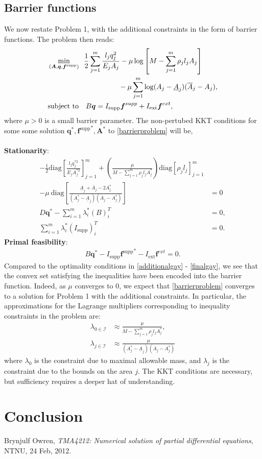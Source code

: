 \documentclass[10pt,a4paper]{article}
\begin{document}
\subsection{Barrier functions}
We now restate Problem 1, with the additional constraints in the form of barrier functions. The problem then reads:
\begin{align}\label{barrierproblem}
&\min_{(\boldsymbol{A},\boldsymbol{q},\boldsymbol{f}^\text{supp})} \enspace \frac{1}{2}\sum_{j=1}^m
\frac{l_j q_j^2}{E_j A_j} - \mu \log \left[ M - \sum_{j=1}^m \rho_j l_j A_j \right] \\
\nonumber & \hspace{35 mm} - \mu \sum_{j=1}^m \log (A_j-\underline{A}_j)(\overline{A}_j-A_j),\\
&\text{subject to} \quad B\boldsymbol{q} = I_\text{supp}\boldsymbol{f}^{supp}+I_\text{ext}\boldsymbol{f}^{ext}\nonumber,
\end{align}
where $\mu > 0 $ is a small barrier parameter.
\newpage
\noindent
The non-pertubed KKT conditions for some some solution $\boldsymbol{q}^*,{\boldsymbol{f}^\text{supp}}^*,\boldsymbol{A}^*$ to \eqref{barrierproblem} will be,
\\\\
\textbf{Stationarity}:
\begin{align}
-\frac{1}{2}\text{diag}\left[ \frac{l_j q_j^{*2}}{E_j A_j^{*2}}\right]_{j=1}^m + \left(\frac{\mu}{M-\sum_{j=1}^m \rho_j l_j A_j^*}\right) \text{diag}\left[ \rho_j l_j \right]_{j=1}^m \\
-\mu \ \text{diag}\left[\frac{\underline{A}_j+\overline{A}_j-2A_j^*}{(A_j^*-\underline{A}_j)(\overline{A}_j-A_j^*)}\right]&=0 \nonumber\\
D\boldsymbol{q}^* - \sum_{i=1}^m \lambda_i^*(B)_i^T &= 0,\\
\sum_{i=1}^m \lambda_i^*(I_\text{supp})_i^T &= 0.
\end{align}
\textbf{Primal feasibility}:
\begin{align}
B\boldsymbol{q}^*-I_\text{supp}{\boldsymbol{f}^\text{supp}}^*-I_\text{ext}\boldsymbol{f}^{ext}=0.
\end{align}
Compared to the optimality conditions in \eqref{additionalgay} - \eqref{finalgay}, we see that the convex set satisfying the inequalities have been encoded into the barrier function. Indeed, as $\mu$ converges to $0$, we expect that \eqref{barrierproblem} converges to a solution for Problem 1 with the additional constraints. In particular, the approximations for the Lagrange multipliers corresponding to inequality constraints in the problem are:
\begin{align}
\lambda_{0\in\mathcal{I}} &\approx \frac{\mu}{M-\sum_{j=1}^m \rho_j l_j A_j^*},\\
\lambda_{j\in\mathcal{I}} &\approx \frac{\mu}{(A_j^*-\underline{A}_j)(\overline{A}_j-A_j^*)}
\end{align}
where $\lambda_0$ is the constraint due to maximal allowable mass, and $\lambda_j$ is the constraint due to the bounds on the area $j$. The KKT conditions are necessary, but sufficiency requires a deeper hat of understanding.
\section{Conclusion}
\begin{thebibliography}{2}
Brynjulf Owren, \emph{TMA4212: Numerical solution of partial differential equations}, NTNU, 24 Feb, 2012.
\end{thebibliography}
\end{document}
